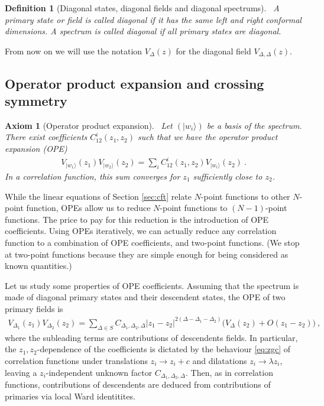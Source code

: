 \documentclass[12pt, a4paper]{article}
\theoremstyle{break}
\newtheorem{hyp}[exo]{Axiom}
\newtheorem{defn}[exo]{Definition}
\begin{document}
\begin{defn}[Diagonal states, diagonal fields and diagonal spectrums]
 ~\label{def:diag}
 A primary state or field is called diagonal if it has the same left and right conformal dimensions. A spectrum is called diagonal if all primary states are diagonal.
\end{defn}
From now on we will use the notation $V_\Delta(z)$ for the diagonal field $V_{\Delta,\Delta}(z)$.

\subsection{Operator product expansion and crossing symmetry}

\begin{hyp}[Operator product expansion]
 ~\label{hyp:ope}
 Let $(|w_i\rangle)$ be a basis of the spectrum.
 There exist coefficients $C^i_{12}(z_1,z_2)$ such that we have the operator product expansion (OPE) 
 \begin{align}
  V_{|w_1\rangle}(z_1)V_{|w_2\rangle}(z_2) = \sum_i C^i_{12}(z_1,z_2) V_{|w_i\rangle}(z_2)\ .
 \end{align}
 In a correlation function,
 this sum converges for $z_1$ sufficiently close to $z_2$.
\end{hyp}
While the linear equations of Section \ref{sec:cft} relate $N$-point functions to other $N$-point function, OPEs allow us to reduce $N$-point functions to $(N-1)$-point functions. 
The price to pay for this reduction is the introduction of OPE coefficients. 
Using OPEs iteratively, we can actually reduce any correlation function to a combination of OPE coefficients, and two-point functions. (We stop at two-point functions because they are simple enough for being considered as known quantities.) 

Let us study some properties of OPE coefficients. 
Assuming that
the spectrum is made of diagonal primary states and their descendent states, the OPE of two primary fields is
\begin{align}
 V_{\Delta_1}(z_1) V_{\Delta_2}(z_2) 
 = \sum_{\Delta\in S} C_{\Delta_1,\Delta_2,\Delta} |z_1-z_2|^{2(\Delta-\Delta_1-\Delta_2)}
 \Big(V_{\Delta}(z_2) + O(z_1-z_2) \Big)\ ,
 \label{eq:ope}
\end{align}
where the subleading terms are contributions of descendents fields. 
In particular, the $z_1,z_2$-dependence of the coefficients is dictated by the behaviour \eqref{eq:zgc}
of correlation functions under translations $z_i\to z_i+c$ and dilatations $z_i\to\lambda z_i$, leaving a $z_i$-independent unknown factor $C_{\Delta_1,\Delta_2,\Delta}$.
Then, as in correlation functions, contributions of descendents are deduced from contributions of primaries via local Ward identitites.
\end{document}
